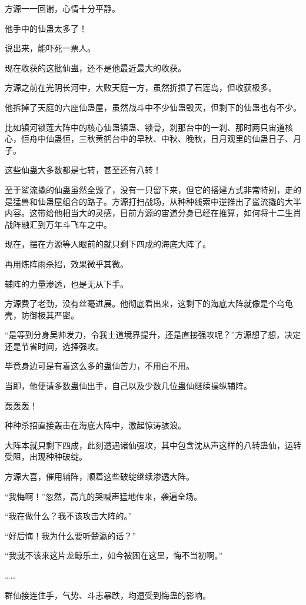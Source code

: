 \begin{this_body}
方源一一回谢，心情十分平静。

他手中的仙蛊太多了！

说出来，能吓死一票人。

现在收获的这批仙蛊，还不是他最近最大的收获。

方源之前在光阴长河中，大败天庭一方，虽然折损了石莲岛，但收获极多。

他拆掉了天庭的六座仙蛊屋，虽然战斗中不少仙蛊毁灭，但剩下的仙蛊也有不少。

比如镇河锁莲大阵中的核心仙蛊镇蛊、锁骨，刹那台中的一刹、那时两只宙道核心，恒舟中仙蛊恒，三秋黄鹤台中的早秋、中秋、晚秋，日月观里的仙蛊日子、月子。

这些仙蛊大多数都是七转，甚至还有八转！

至于鲨流撬的仙蛊虽然全毁了，没有一只留下来，但它的搭建方式非常特别，走的是猛兽和仙蛊屋组合的路子。方源打扫战场，从种种线索中逆推出了鲨流撬的大半内容。这带给他相当大的灵感，目前方源的宙道分身已经在推算，如何将十二生肖战阵融汇到万年斗飞车之中。

现在，摆在方源等人眼前的就只剩下四成的海底大阵了。

再用炼阵雨杀招，效果微乎其微。

辅阵的力量渗透，也是无从下手。

方源费了老劲，没有丝毫进展。他彻底看出来，这剩下的海底大阵就像是个乌龟壳，防御极其严密。

“是等到分身吴帅发力，令我土道境界提升，还是直接强攻呢？”方源想了想，决定还是节省时间，选择强攻。

毕竟身边可是有着这么多的蛊仙苦力，不用白不用。

当即，他便请多数蛊仙出手，自己以及少数几位蛊仙继续操纵辅阵。

轰轰轰！

种种杀招直接轰击在海底大阵中，激起惊涛骇浪。

大阵本就只剩下四成，此刻遭遇诸仙强攻，其中包含沈从声这样的八转蛊仙，运转受阻，出现种种破绽。

方源大喜，催用辅阵，顺着这些破绽继续渗透大阵。

“我悔啊！”忽然，高亢的哭喊声猛地传来，袭遍全场。

“我在做什么？我不该攻击大阵的。”

“好后悔！我为什么要听楚瀛的话？”

“我就不该来这片龙鲸乐土，如今被困在这里，悔不当初啊。”

……

群仙接连住手，气势、斗志暴跌，均遭受到悔蛊的影响。


\end{this_body}
